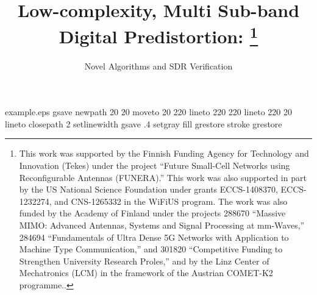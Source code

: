 %
%
%
%
%
\begin{filecontents*}{example.eps}
gsave
newpath
  20 20 moveto
  20 220 lineto
  220 220 lineto
  220 20 lineto
closepath
2 setlinewidth
gsave
  .4 setgray fill
grestore
stroke
grestore
\end{filecontents*}
%
\RequirePackage{fix-cm}
%
\documentclass[twocolumn]{svjour3}          %
%
\smartqed  %
%
\usepackage{amsmath,graphicx}
\usepackage{import}
\usepackage[ruled]{algorithm2e}
\usepackage{color}
%
%
%
%
%


\title{Low-complexity, Multi Sub-band Digital Predistortion:
		\thanks{This work was supported by the Finnish Funding Agency for Technology
		and Innovation (Tekes) under the project “Future Small-Cell Networks using
		Reconfigurable Antennas (FUNERA).” This work was also supported in part
		by the US National Science Foundation under grants ECCS-1408370, ECCS-
		1232274, and CNS-1265332 in the WiFiUS program. The work was also
		funded by the Academy of Finland under the projects 288670 “Massive MIMO:
		Advanced Antennas, Systems and Signal Processing at mm-Waves,” 284694
		“Fundamentals of Ultra Dense 5G Networks with Application to Machine Type
		Communication,” and 301820 “Competitive Funding to Strengthen University
		Research Proles,” and by the Linz Center of Mechatronics (LCM) in the
		framework of the Austrian COMET-K2 programme..}
}
\subtitle{Novel Algorithms and SDR Verification}

